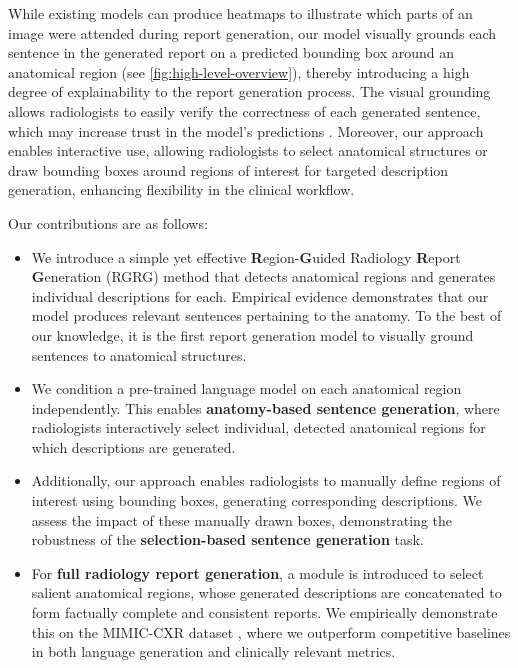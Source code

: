 \documentclass[10pt,twocolumn,letterpaper]{article}
\begin{document}
While existing models \cite{jing2018automatic, liu2019clinically, chen2020generating} can produce heatmaps to illustrate which parts of an image were attended during report generation, our model visually grounds each sentence in the generated report on a predicted bounding box around an anatomical region (see \cref{fig:high-level-overview}), thereby introducing a high degree of explainability to the report generation process. The visual grounding allows radiologists to easily verify the correctness of each generated sentence, which may increase trust in the model's predictions \cite{reyes2020interpretability, miller2019explanation, geis2019ethics}. 
Moreover, our approach enables interactive use, allowing radiologists to select anatomical structures or draw bounding boxes around regions of interest for targeted description generation, enhancing flexibility in the clinical workflow.

Our contributions are as follows:
\begin{itemize}
  \item We introduce a simple yet effective \textbf{R}egion-\textbf{G}uided Radiology \textbf{R}eport \textbf{G}eneration (RGRG) method that detects anatomical regions and generates individual descriptions for each. Empirical evidence demonstrates that our model produces relevant sentences pertaining to the anatomy. To the best of our knowledge, it is the first report generation model to visually ground sentences to anatomical structures.
  \item We condition a pre-trained language model on each anatomical region independently. This enables \textbf{anatomy-based sentence generation}, where radiologists interactively select individual, detected anatomical regions for which descriptions are generated.
  \item Additionally, our approach enables radiologists to manually define regions of interest using bounding boxes, generating corresponding descriptions. We assess the impact of these manually drawn boxes, demonstrating the robustness of the \textbf{selection-based sentence generation} task.
  \item For \textbf{full radiology report generation}, a module is introduced to select salient anatomical regions, whose generated descriptions are concatenated to form factually complete and consistent reports. We empirically demonstrate this on the MIMIC-CXR dataset \cite{johnson2019mimic,johnson2019mimicphysio}, where we outperform competitive baselines in both language generation and clinically relevant metrics.
\end{itemize}
\end{document}
